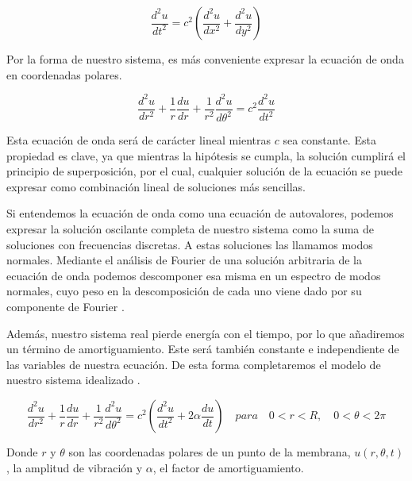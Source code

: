 \documentclass[journal, a4paper,onecolumn]{IEEEtran}
\begin{document}
\begin{equation}
    \frac{d^2 u}{dt^2} = c^2 \left( \frac{d^2 u}{dx^2}+\frac{d^2 u}{dy^2}\right)
\end{equation}
\newline

Por la forma de nuestro sistema, es más conveniente expresar la ecuación de onda en coordenadas polares.\newline

\begin{equation}
     \frac{d^2u}{dr^2}+\frac{1}{r}\frac{du}{dr}+\frac{1}{r^2}\frac{d^2u}{d\theta^2}=c^2\frac{d^2u}{dt^2}
\end{equation}
\newline

Esta ecuación de onda será de carácter lineal mientras $c$ sea constante. Esta propiedad es clave, ya que mientras la hipótesis se cumpla, la solución cumplirá el principio de superposición, por el cual, cualquier solución de la ecuación se puede expresar como combinación lineal de soluciones más sencillas. \newline

Si entendemos la ecuación de onda como una ecuación de autovalores, podemos expresar la solución oscilante completa de nuestro sistema como la suma de soluciones con frecuencias discretas. A estas soluciones las llamamos modos normales. Mediante el análisis de Fourier de una solución arbitraria de la ecuación de onda podemos descomponer esa misma en un espectro de modos normales, cuyo peso en la descomposición de cada uno viene dado por su componente de Fourier \cite{luismi}.\newline

Además, nuestro sistema real pierde energía con el tiempo, por lo que añadiremos un término de amortiguamiento. Este será también constante e independiente de las variables de nuestra ecuación. De esta forma completaremos el modelo de nuestro sistema idealizado \cite{soundsimulation}.\newline 

\begin{equation}
    \frac{d^2u}{dr^2}+\frac{1}{r}\frac{du}{dr}+\frac{1}{r^2}\frac{d^2u}{d\theta^2}=c^2(\frac{d^2u}{dt^2}+2 \alpha \frac{du}{dt}) \quad para \quad 0<r<R , \quad 0<\theta<2\pi
\end{equation}\newline 

Donde $r$ y $\theta$ son las coordenadas polares de un punto de la membrana, $u(r,\theta,t)$, la amplitud de vibración y $\alpha$, el factor de amortiguamiento.\newline
\end{document}
